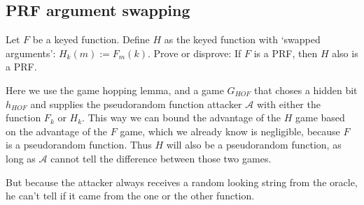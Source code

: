 \documentclass{article}
\begin{document}
  \subsection{PRF argument swapping}
  \begin{centerframebox}
    Let $F$ be a keyed function. Define $H$ as the keyed function with `swapped arguments': $H_k(m) := F_m(k)$.
    Prove or disprove: If $F$ is a PRF, then $H$ also is a PRF.
  \end{centerframebox}

  Here we use the game hopping lemma, and a game $G_{HOF}$ that choses a hidden bit $h_{HOF}$ and supplies
  the pseudorandom function attacker $\mathcal{A}$ with either the function $F_k$ or $H_k$.
  This way we can bound the advantage of the $H$ game based on the advantage of the $F$ game,
  which we already know is negligible, because $F$ is a pseudorandom function.
  Thus $H$ will also be a pseudorandom function, as long as $\mathcal{A}$ cannot tell the difference between those two games.

  But because the attacker always receives a random looking string from the oracle,
  he can't tell if it came from the one or the other function.

\end{document}

